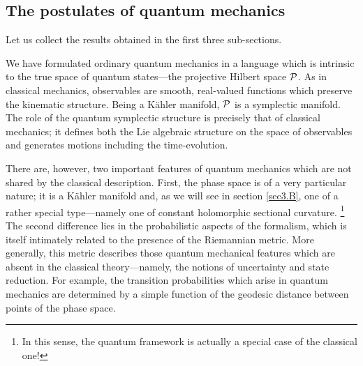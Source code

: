 \documentclass[12pt,aps,eqsecnum,tighten,nofootinbib]{revtex4-2}
\def\P{{\cal P}}
\begin{document}
\subsection{The postulates of quantum mechanics} \label{sec2.D}

Let us collect the results obtained in the first three sub-sections.

We have formulated ordinary quantum mechanics in a language which is
intrinsic to the true space of quantum states---the projective Hilbert
space $\P$.  As in classical mechanics, observables are smooth,
real-valued functions which preserve the kinematic structure.  Being a
K\"ahler manifold, $\P$ is a symplectic manifold.  The role of the
quantum symplectic structure is precisely that of classical mechanics;
it defines both the Lie algebraic structure on the space of
observables and generates motions including the time-evolution.

There are, however, two important features of quantum mechanics which
are not shared by the classical description.  First, the phase space
is of a very particular nature; it is a K\"ahler manifold and, as we
will see in section \ref{sec3.B}, one of a rather special
type---namely one of constant holomorphic sectional curvature.%
%
\footnote{In this sense, the quantum framework is actually a special 
case of the classical one!}
%
The second difference lies in the probabilistic aspects of the
formalism, which is itself intimately related to the presence of the
Riemannian metric. More generally, this metric describes those quantum
mechanical features which are absent in the classical theory---namely,
the notions of uncertainty and state reduction.  For example, the
transition probabilities which arise in quantum mechanics are
determined by a simple function of the geodesic distance between
points of the phase space.
\end{document}
